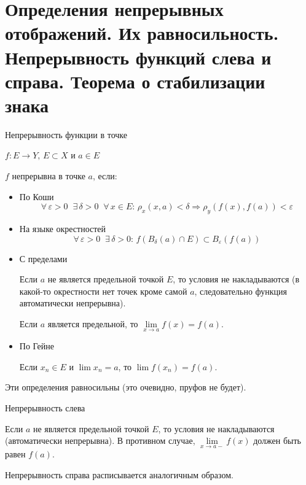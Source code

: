 \section{Определения непрерывных отображений. Их равносильность. Непрерывность функций слева и справа. Теорема о стабилизации знака \href{https://youtu.be/BiTNBigkkyU?t=7551}{\Walley}}

\begin{conj}
    Непрерывность функции в точке
\end{conj}
$f : E \to Y, \, E \subset X$ и $a \in E$

$f$ непрерывна в точке $a$, если:
\begin{itemize}
    \item По Коши
    \[ \forall \, \varepsilon > 0 \;\; \exists \, \delta > 0 \;\; \forall \, x \in E : \, \rho_x(x, a) < \delta \Rightarrow \rho_y(f(x), f(a)) < \varepsilon \]
    \item На языке окрестностей
    \[ \forall \, \varepsilon > 0 \;\; \exists \, \delta > 0 : \, f(B_{\delta}(a) \cap E) \subset B_{\varepsilon}(f(a)) \]
    \item С пределами
    
    Если $a$ не является предельной точкой $E$, то условия не накладываются (в какой-то окрестности нет точек кроме самой $a$, следовательно функция автоматически непрерывна).

    Если $a$ является предельной, то $\lim\limits_{x \to a} f(x) = f(a)$.
    \item По Гейне
    
    Если $x_n \in E$ и $\lim x_n = a$, то $\lim f(x_n) = f(a)$.
\end{itemize}
\begin{notice}
    Эти определения равносильны (это очевидно, пруфов не будет).
\end{notice}

\begin{conj}
    Непрерывность слева

    Если $a$ не является предельной точкой $E$, то условия не накладываются (автоматически непрерывна). 
    В противном случае, $\lim\limits_{x \to a-} f(x)$ должен быть равен $f(a)$. 
\end{conj}
\begin{notice}
    Непрерывность справа расписывается аналогичным образом.
\end{notice}

